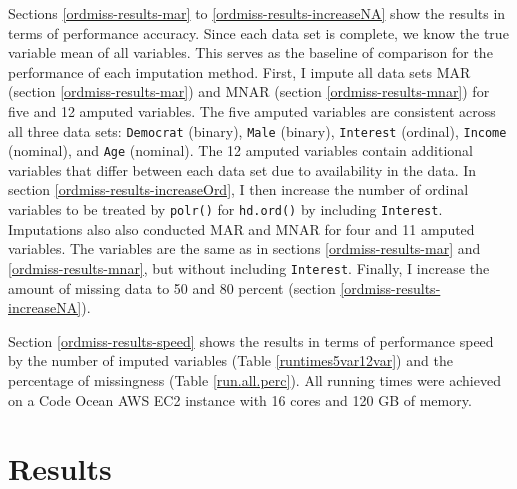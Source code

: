 \documentclass[12pt,econ]{sources/authesis}
\begin{document}
Sections \ref{ordmiss-results-mar} to \ref{ordmiss-results-increaseNA} show the results in terms of performance accuracy. Since each data set is complete, we know the true variable mean of all variables. This serves as the baseline of comparison for the performance of each imputation method. First, I impute all data sets MAR (section \ref{ordmiss-results-mar}) and MNAR (section \ref{ordmiss-results-mnar}) for five and 12 amputed variables. The five amputed variables are consistent across all three data sets: \texttt{Democrat} (binary), \texttt{Male} (binary), \texttt{Interest} (ordinal), \texttt{Income} (nominal), and \texttt{Age} (nominal). The 12 amputed variables contain additional variables that differ between each data set due to availability in the data. In section \ref{ordmiss-results-increaseOrd}, I then increase the number of ordinal variables to be treated by \texttt{polr()} for \texttt{hd.ord()} by including \texttt{Interest}. Imputations also also conducted MAR and MNAR for four and 11 amputed variables. The variables are the same as in sections \ref{ordmiss-results-mar} and \ref{ordmiss-results-mnar}, but without including \texttt{Interest}. Finally, I increase the amount of missing data to 50 and 80 percent (section \ref{ordmiss-results-increaseNA}).

Section \ref{ordmiss-results-speed} shows the results in terms of performance speed by the number of imputed variables (Table \ref{runtimes5var12var}) and the percentage of missingness (Table \ref{run.all.perc}). All running times were achieved on a Code Ocean AWS EC2 instance with 16 cores and 120 GB of memory.

\hypertarget{ordmiss-results}{%
\section{Results}\label{ordmiss-results}}
\end{document}
